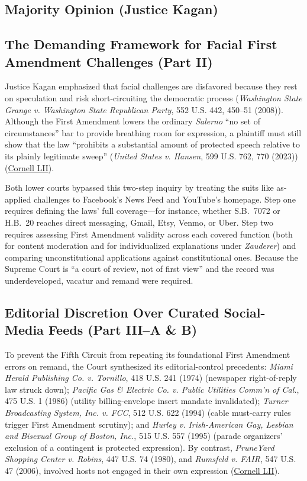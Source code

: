 \documentclass[12pt]{article}
\begin{document}
\subsection{Majority Opinion (Justice Kagan)}

\subsection{The Demanding Framework for Facial First Amendment Challenges (Part II)}
Justice Kagan emphasized that facial challenges are disfavored because they rest on speculation and risk short-circuiting the democratic process (\textit{Washington State Grange v. Washington State Republican Party}, 552 U.S. 442, 450--51 (2008)). Although the First Amendment lowers the ordinary \textit{Salerno} ``no set of circumstances'' bar to provide breathing room for expression, a plaintiff must still show that the law ``prohibits a substantial amount of protected speech relative to its plainly legitimate sweep'' (\textit{United States v. Hansen}, 599 U.S. 762, 770 (2023)) (\href{https://www.law.cornell.edu/supremecourt/text/22-277}{Cornell LII}).

Both lower courts bypassed this two-step inquiry by treating the suits like as-applied challenges to Facebook's News Feed and YouTube's homepage. Step one requires defining the laws' full coverage---for instance, whether S.B.~7072 or H.B.~20 reaches direct messaging, Gmail, Etsy, Venmo, or Uber. Step two requires assessing First Amendment validity across each covered function (both for content moderation and for individualized explanations under \textit{Zauderer}) and comparing unconstitutional applications against constitutional ones. Because the Supreme Court is ``a court of review, not of first view'' and the record was underdeveloped, vacatur and remand were required.

\subsection{Editorial Discretion Over Curated Social-Media Feeds (Part III--A \& B)}
To prevent the Fifth Circuit from repeating its foundational First Amendment errors on remand, the Court synthesized its editorial-control precedents: \textit{Miami Herald Publishing Co. v. Tornillo}, 418 U.S. 241 (1974) (newspaper right-of-reply law struck down); \textit{Pacific Gas \& Electric Co. v. Public Utilities Comm'n of Cal.}, 475 U.S. 1 (1986) (utility billing-envelope insert mandate invalidated); \textit{Turner Broadcasting System, Inc. v. FCC}, 512 U.S. 622 (1994) (cable must-carry rules trigger First Amendment scrutiny); and \textit{Hurley v. Irish-American Gay, Lesbian and Bisexual Group of Boston, Inc.}, 515 U.S. 557 (1995) (parade organizers' exclusion of a contingent is protected expression). By contrast, \textit{PruneYard Shopping Center v. Robins}, 447 U.S. 74 (1980), and \textit{Rumsfeld v. FAIR}, 547 U.S. 47 (2006), involved hosts not engaged in their own expression (\href{https://www.law.cornell.edu/supremecourt/text/22-277}{Cornell LII}).
\end{document}
